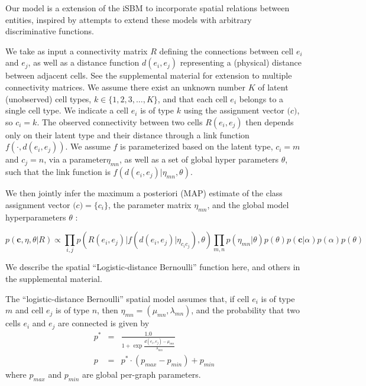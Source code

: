 \documentclass{article}
\renewcommand{\vec}[1]{\mathbf{#1}}
\begin{document}
Our model is a extension of the iSBM
\autocite{Kemp2006a,Xu2006} to incorporate spatial relations between entities,
inspired by attempts to extend these models with arbitrary
discriminative functions\autocite{Murphy2012}.

We take as input a connectivity matrix $R$ defining the connections
between cell $e_i$ and $e_j$, as well as a distance function $d(e_i,
e_j)$ representing a (physical) distance between adjacent cells. See
the supplemental material for extension to multiple connectivity
matrices. We assume there exist an unknown number $K$ of latent
(unobserved) cell types, $k \in \{1, 2, 3, \dots, K\}$, and that each
cell $e_i$ belongs to a single cell type. We indicate a cell $e_i$ is
of type $k$ using the assignment vector $\vec(c)$, so $c_i = k$. The
observed connectivity between two cells $R(e_i, e_j)$ then depends
only on their latent type and their distance through a link function
$f(\cdot, d(e_i, e_j))$. We assume $f$ is parameterized based on the
latent type, $c_i=m$ and $c_j=n$, via a parameter$\eta_{mn}$, as well
as a set of global hyper parameters $\theta$, such that the link
function is $f(d(e_i, e_j) | \eta_{mn}, \theta)$. 


We then jointly infer the maximum a posteriori (MAP) estimate of the
class assignment vector $\vec(c) = \{c_i\}$, the parameter matrix $\eta_{mn}$, and
the global model hyperparameters $\theta$ :

\begin{equation}
  p(\vec{c}, \eta, \theta | R ) \propto \prod_{i, j} p(R(e_i, e_j) | f(d(e_i, e_j) | \eta_{c_ic_j}), \theta) \prod_{m, n} p(\eta_{mn} | \theta)  p(\theta) p(\vec{c} | \alpha) p(\alpha) p(\theta)
\end{equation}





We describe the spatial ``Logistic-distance Bernoulli''  function here,
and others in the supplemental material. 

The ``logistic-distance Bernoulli'' spatial model assumes that, if cell
$e_i$ is of type $m$ and cell $e_j$ is of type $n$, then $\eta_{mn}
= (\mu_{mn}, \lambda_{mn})$, and the probability that two cells $e_i$
and $e_j$ are connected is given by
\begin{eqnarray}
p^* &=& \frac{1.0}{1 + \exp \frac{d(e_i, e_j) - \mu_{mn}}{\lambda_{mn}}}\\
p &= & p^* \cdot (p_{max} - p_{min}) + p_{min}
\end{eqnarray}
where $p_{max}$ and $p_{min}$ are global per-graph parameters. 
\end{document}
